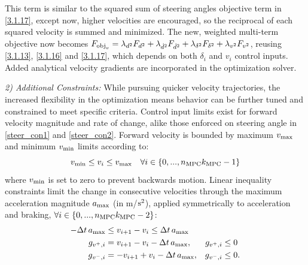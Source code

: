 \documentclass[journal]{IEEEtran}
\begin{document}
This term is similar to the squared sum of steering angles objective term in \eqref{3.1.17}, except now, higher velocities are encouraged, so the reciprocal of each squared velocity is summed and minimized. The new, weighted multi-term objective now becomes $F_{\textup{obj}_v}=\lambda_{d^2}F_{d^2}+\lambda_{\dot d^2}F_{\dot d^2}+\lambda_{\delta^2}F_{\delta^2}+\lambda_{v^2}F_{v^2}$, reusing \eqref{3.1.13}, \eqref{3.1.16} and \eqref{3.1.17}, which depends on both $\delta_i$ and $v_i$ control inputs. Added analytical velocity gradients are incorporated in the optimization solver.

\indent \textit{2) Additional Constraints:}
While pursuing quicker velocity trajectories, the increased flexibility in the optimization means behavior can be further tuned and constrained to meet specific criteria. Control input limits exist for forward velocity magnitude and rate of change, alike those enforced on steering angle in \eqref{steer_con1} and \eqref{steer_con2}. Forward velocity is bounded by maximum $v_\textup{max}$ and minimum $v_\textup{min}$ limits according to:
\begin{equation}
    v_\textup{min}\leq v_i\leq v_\textup{max} \quad \forall i\in \{0,...,n_\textup{MPC}k_\textup{MPC}-1\}
\end{equation}
where $v_\textup{min}$ is set to zero to prevent backwards motion. Linear inequality constraints limit the change in consecutive velocities through the maximum acceleration magnitude $a_\textup{max}$ (in m/$\textup{s}^2$), applied symmetrically to acceleration and braking, \mbox{$\forall i\in \{0,...,n_\textup{MPC}k_\textup{MPC}-2\}$}:
\begin{subequations}
\label{vel_change}
\begin{align}
    -\Delta t\,a_\textup{max}&\leq v_{i+1}-v_i \leq\Delta t\,a_\textup{max}\nonumber \\
    g_{v^+,i}&=v_{i+1}-v_i -\Delta t\,a_\textup{max},& g_{v^+,i}\leq0\; \label{5.3.2} \\
    g_{v^-,i}&=-v_{i+1}+v_i -\Delta t\,a_\textup{max},& g_{v^-,i}\leq0. \label{5.3.3}
\end{align}
\end{subequations}
\end{document}

